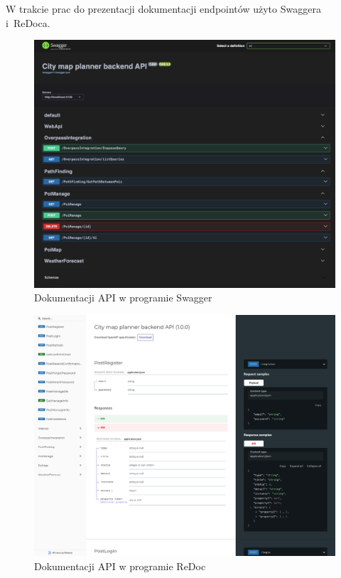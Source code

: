 W trakcie prac do prezentacji dokumentacji endpointów użyto Swaggera i~ReDoca.

\begin{figure}[H]
\centering
\includegraphics[width=1\textwidth]{attachments/swagger}
\caption{Dokumentacji API w programie Swagger}
\label{fig:figure}
\end{figure}

\begin{figure}[H]
\centering
\includegraphics[width=1\textwidth]{attachments/redoc}
\caption{Dokumentacji API w programie ReDoc}
\label{fig:figure}
\end{figure}

